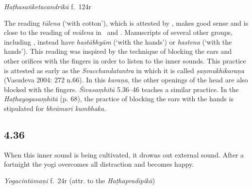 \begin{ekdosis}
\begin{testimonia}[hp04_035]
\emph{Haṭhasaṅketacandrikā} f.~124r
\begin{versinnote}
\end{versinnote}
\end{testimonia}

\begin{philcomm}[hp04_035]
%

The reading \emph{tūlena} (`with cotton'), which is attested by \alphaThree, makes good sense and is close to the reading of \emph{mūlena} in \alphaOne\ and \alphaTwo. Manuscripts of several other groups, including \textgamma, instead have \emph{hastābhyām} (`with the hands') or \emph{hastena} (`with the hands'). This reading was inspired by the technique of blocking the ears and other orifices with the fingers in order to listen to the inner sounds. This practice is attested as early as the \textit{Svacchandatantra} in which it is called \textit{ṣaṇmukhīkaraṇa} (Vasudeva 2004: 272 n.66). In this \emph{karaṇa}, the other openings of the head are also blocked with the fingers. \emph{Śivasaṃhitā} 5.36–46 teaches a similar practice. In the \textit{Haṭhayogasaṃhitā} (p. 68), the practice of blocking the ears with the hands is stipulated for \textit{bhrāmarī kumbhaka}.
\end{philcomm}

\subsection*{4.36}
\begin{translation}[hp04_036]
When this inner sound is being cultivated, it drowns out external sound. After a fortnight the yogi overcomes all distraction and becomes happy.
\end{translation}


\begin{testimonia}[hp04_036]
\emph{Yogacintāmaṇi} f.~24r (attr. to the \emph{Haṭhapradīpikā})
\begin{versinnote}
\end{versinnote}


\end{testimonia}
\end{ekdosis}
